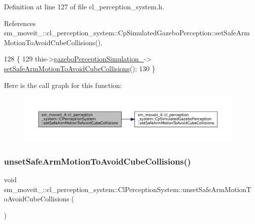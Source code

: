 Definition at line 127 of file cl\+\_\+perception\+\_\+system.\+h.



References sm\+\_\+moveit\+\_\+::cl\+\_\+perception\+\_\+system\+::\+Cp\+Simulated\+Gazebo\+Perception\+::set\+Safe\+Arm\+Motion\+To\+Avoid\+Cube\+Collisions().


\begin{DoxyCode}
128             \{
129                 this->\hyperlink{classsm__moveit__4_1_1cl__perception__system_1_1ClPerceptionSystem_a027c07df3f1a2cc0c30be111b27dbe5c}{gazeboPerceptionSimulation\_}->
      \hyperlink{classsm__moveit__4_1_1cl__perception__system_1_1CpSimulatedGazeboPerception_af42b5a4e239fcac98a222c34115c9bc0}{setSafeArmMotionToAvoidCubeCollisions}();
130             \}
\end{DoxyCode}
Here is the call graph for this function\+:
\nopagebreak
\begin{figure}[H]
\begin{center}
\leavevmode
\includegraphics[width=350pt]{classsm__moveit__4_1_1cl__perception__system_1_1ClPerceptionSystem_a5304dc8734488564093525dfe4f4bcd1_cgraph}
\end{center}
\end{figure}
\mbox{\label{classsm__moveit__4_1_1cl__perception__system_1_1ClPerceptionSystem_ab8bbe4be37d763fde0e67e9edd33b83a}} 
\subsubsection{\texorpdfstring{unset\+Safe\+Arm\+Motion\+To\+Avoid\+Cube\+Collisions()}{unsetSafeArmMotionToAvoidCubeCollisions()}}
{\footnotesize\ttfamily void sm\+\_\+moveit\+\_\+::cl\+\_\+perception\+\_\+system\+::\+Cl\+Perception\+System\+::unset\+Safe\+Arm\+Motion\+To\+Avoid\+Cube\+Collisions (\begin{DoxyParamCaption}{ }\end{DoxyParamCaption})\hspace{0.3cm}{\ttfamily [inline]}}



